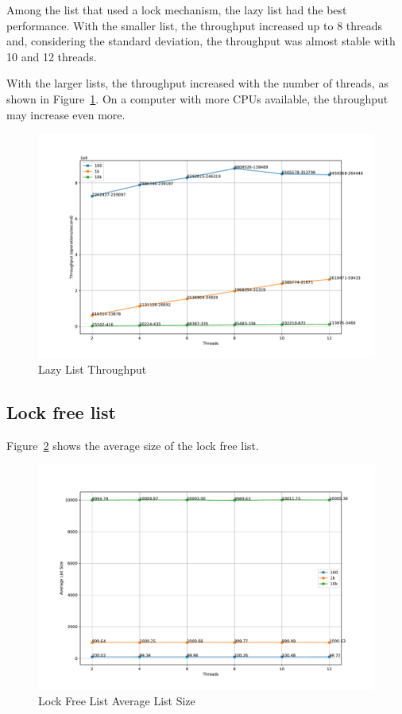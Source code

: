 \documentclass{article}
\begin{document}
Among the list that used a lock mechanism, the lazy list had the best performance. With the smaller list, the throughput increased up to 8 threads and, considering the standard deviation, the throughput was almost stable with 10 and 12 threads.

With the larger lists, the throughput increased with the number of threads, as shown in Figure~\ref{fig:lazy-throughput}. On a computer with more CPUs available, the throughput may increase even more.

\begin{figure}[H]
    \centering
    \includegraphics[width=\textwidth]{../test/plots/LazyListThroughput.pdf}
    \caption{Lazy List Throughput}
    \label{fig:lazy-throughput}
\end{figure}

\subsection{Lock free list}

Figure~\ref{fig:lock-free-size} shows the average size of the lock free list.

\begin{figure}[H]
    \centering
    \includegraphics[scale=0.4]{../test/plots/LockFreeListAverageListSize.pdf}
    \caption{Lock Free List Average List Size}
    \label{fig:lock-free-size}
\end{figure}
\end{document}
